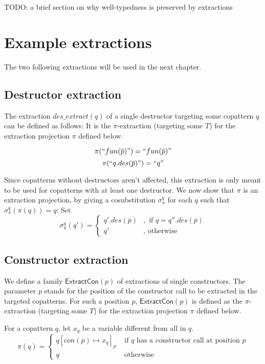 TODO: a brief section on why well-typedness is preserved by extractions

\section{Example extractions}
\label{sec:extrex}

The two following extractions will be used in the next chapter.

\subsection{Destructor extraction}

The extraction $des\_extract(q)$ of a single destructor targeting some copattern $q$ can be defined as follows: It is the $\pi$-extraction (targeting some $T$) for the extraction projection $\pi$ defined below.

\[
\pi(`` fun(\overline{p}) ") = `` fun(\overline{p}) "
\]
\[
\pi(`` q.des(\overline{p}) ") = `` q "
\]

Since copatterns without destructors aren't affected, this extraction is only meant to be used for copatterns with at least one destructor. We now show that $\pi$ is an extraction projection, by giving a cosubstitution $\sigma^q_\pi$ for each $q$ such that $\sigma^q_\pi(\pi(q)) = q$: Set
\[
\sigma^q_\pi(q') = \begin{cases}
                              q'.des(\overline{p}) &,\text{ if } q = q''.des(\overline{p}) \\
                              q' &,\text{ otherwise}
                              \end{cases}
\]

\subsection{Constructor extraction}

We define a family $\textsf{ExtractCon}(p)$ of extractions of single constructors. The parameter $p$ stands for the position of the constructor call to be extracted in the targeted copatterns. For such a position $p$, $\textsf{ExtractCon}(p)$ is defined as the $\pi$-extraction (targeting some $T$) for the extraction projection $\pi$ defined below.

For a copattern $q$, let $x_q$ be a variable different from all in $q$.
\[
\pi(q) = \begin{cases}
             q[con(\overline{p}) \mapsto x_q]_p &\text{ if } q \text{ has a constructor call at position } p \\
             q &\text{ otherwise}
             \end{cases}
\]

